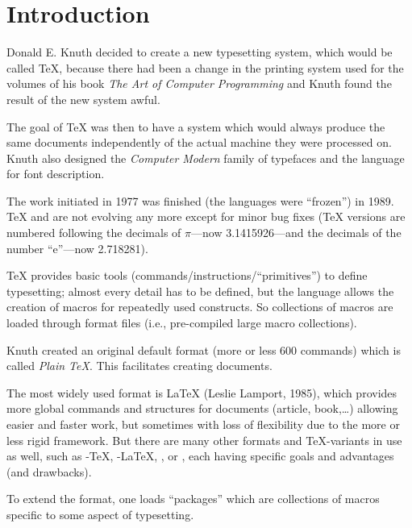 
\chapter{Introduction}

Donald E. Knuth decided to create a new typesetting system, which would be called {\TeX}, because there had been a change in the printing system used for the volumes of his book \emph{The Art of Computer Programming} and Knuth found the result of the new system awful.

The goal of {\TeX} was then to have a system which would always produce the same documents independently of the actual machine they were processed on. Knuth also designed the \emph{Computer Modern} family of typefaces and the \METAFONT{} language for font description.

The work initiated in 1977 was finished (the languages were  ``frozen'') in 1989. {\TeX} and {\METAFONT} are not evolving any more except for minor bug fixes ({\TeX} versions are numbered following the decimals of $\pi$---now 3.1415926---and {\METAFONT} the decimals of the number ``e''---now 2.718281).

{\TeX} provides basic tools (commands/instructions/``primitives'') to define typesetting; almost every detail has to be defined, but the language allows the creation of macros for repeatedly used constructs. So collections of macros are loaded through format files (i.e., pre-compiled large macro collections).

Knuth created an original default format (more or less 600 commands) which is called \emph{Plain \TeX{}}. This facilitates creating documents.

The most widely used format is \LaTeX{} (Leslie Lamport, 1985), which provides more global commands and structures for documents (article, book,\dots) allowing easier and faster work, but sometimes with loss of flexibility due to the more or less rigid framework. But there are many other formats and {\TeX}-variants in use as well, such as \AmS-\TeX{}, \AmS-\LaTeX, \ConTeXt{}, or \XeTeX, each having specific goals and advantages (and drawbacks).

To extend the format, one loads ``packages'' which are collections of macros specific to some aspect of typesetting.


